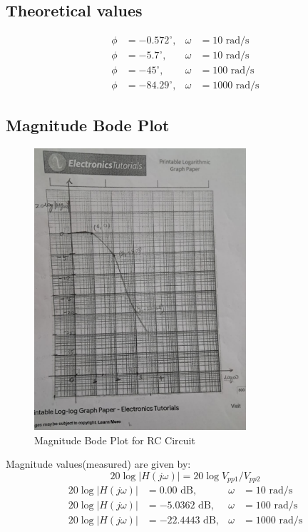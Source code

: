 \documentclass[a4paper,12pt]{article}
\begin{document}
\subsection{Theoretical values}
\begin{align}
\phi &= -0.572^\circ , & \omega &= 10 \text{ rad/s} \\
\phi &= -5.7^\circ , & \omega &= 10 \text{ rad/s} \\
\phi &= -45^\circ , & \omega &= 100 \text{ rad/s} \\
\phi &= -84.29^\circ , & \omega &= 1000 \text{ rad/s}
\end{align}
\subsection{Magnitude Bode Plot}
\begin{figure}[H]
    \centering
    \includegraphics[width=0.7\textwidth]{fig/mbd1.jpeg} %
    \caption{Magnitude Bode Plot for RC Circuit}
\end{figure}
Magnitude values(measured) are given by:
$$20\log{|H(j\omega)|}=20\log{V_{pp1}/V_{pp2}}$$
\begin{align}
20\log|H(j\omega)| &= 0.00 \text{ dB}, & \omega &= 10 \text{ rad/s} \\
20\log|H(j\omega)| &= -5.0362 \text{ dB}, & \omega &= 100 \text{ rad/s} \\
20\log|H(j\omega)| &= -22.4443 \text{ dB}, & \omega &= 1000 \text{ rad/s}
\end{align}
\end{document}
